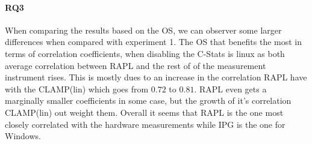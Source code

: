 \paragraph{RQ3}
When comparing the results based on the OS, we can observer some larger differences when compared with experiment 1. The OS that benefits the most in terms of correlation coefficients, when disabling the C-Stats is linux as both average correlation between RAPL and the rest of of the measurement instrument rises. This is mostly dues to an increase in the correlation RAPL have with the CLAMP(lin) which goes from $0.72$ to $0.81$. RAPL even gets a marginally smaller coefficients in some case, but the growth of it's correlation CLAMP(lin) out weight them.  Overall it seems that RAPL is the one most closely correlated with the hardware measurements while IPG is the one for Windows.





%  


% 

% 


